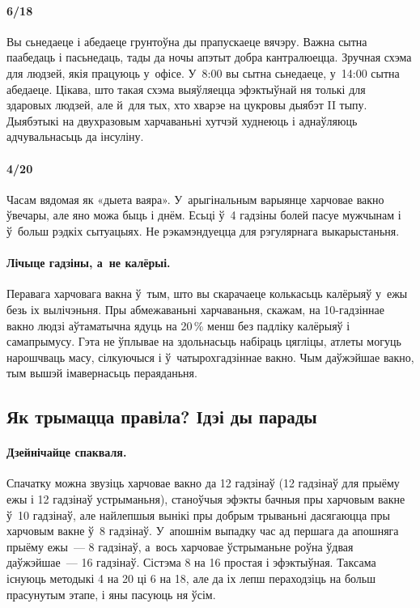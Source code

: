 
\paragraph{6/18}
Вы сьнедаеце і абедаеце грунтоўна ды прапускаеце вячэру. Важна сытна паабедаць і пасьнедаць, тады да ночы апэтыт добра кантралюецца. Зручная схэма для людзей, якія працуюць у~офісе. У~8:00 вы сытна сьнедаеце, у~14:00 сытна абедаеце. Цікава, што такая схэма выяўляецца эфэктыўнай ня толькі для здаровых людзей, але й~для тых, хто хварэе на цукровы дыябэт II тыпу. Дыябэтыкі на двухразовым харчаваньні хутчэй худнеюць і аднаўляюць адчувальнасьць да інсуліну.

\paragraph{4/20}
Часам вядомая як «дыета ваяра». У~арыгінальным варыянце харчовае вакно ўвечары, але яно можа быць і днём. Есьці ў~4 гадзіны болей пасуе мужчынам і ў~больш рэдкіх сытуацыях. Не рэкамэндуецца для рэгулярнага выкарыстаньня.

\paragraph{Лічыце гадзіны, а~не калёрыі.}
Перавага харчовага вакна ў~тым, што вы скарачаеце колькасьць калёрыяў у~ежы безь іх вылічэньня. Пры абмежаваньні харчаваньня, скажам, на 10-гадзіннае вакно людзі аўтаматычна ядуць на 20\,\% менш без падліку калёрыяў і самапрымусу. Гэта не ўплывае на здольнасьць набіраць цягліцы, атлеты могуць нарошчваць масу, сілкуючыся і ў~чатырохгадзіннае вакно. Чым даўжэйшае вакно, тым вышэй імавернасьць пераяданьня.

\subsection{Як трымацца правіла? Ідэі ды парады}

\paragraph{Дзейнічайце спакваля.}
Спачатку можна звузіць харчовае вакно да 12 гадзінаў (12 гадзінаў для прыёму ежы і 12 гадзінаў устрыманьня), станоўчыя эфэкты бачныя пры харчовым вакне ў~10 гадзінаў, але найлепшыя вынікі пры добрым трываньні дасягаюцца пры харчовым вакне ў~8 гадзінаў. У~апошнім выпадку час ад першага да апошняга прыёму ежы~--- 8 гадзінаў, а~вось харчовае ўстрыманьне роўна ўдвая даўжэйшае~--- 16 гадзінаў. Сістэма 8 на 16 простая і эфэктыўная. Таксама існуюць методыкі 4 на 20 ці 6 на 18, але да іх лепш пераходзіць на больш прасунутым этапе, і яны пасуюць ня ўсім.

